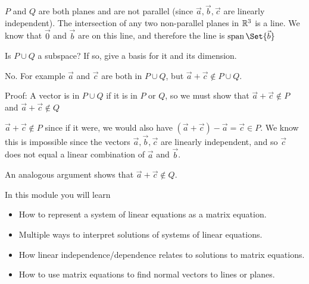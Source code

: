 \documentclass{workbook}
\begin{document}
\begin{slide}
\begin{parts}
\begin{solution}
				$P$ and $Q$ are both planes and are not parallel (since
				$\vec a,\vec b,\vec c$ are linearly independent). The intersection
				of any two non-parallel	planes in $\mathbb{R}^3$ is a line.
				We know that $\vec 0$ and $\vec b$ are on this line, and therefore
				the line is $\Span\Set{\vec b}$
			\end{solution}
		\item Is $P\cup Q$ a subspace? If so, give a basis for it and its dimension.
			\begin{solution}
				No. For example $\vec a$ and $\vec c$ are both in $P\cup Q$, but
				$\vec a+\vec c \notin P\cup Q$.

				Proof: A vector is in $P\cup Q$ if it is in $P$ or $Q$, so we must show
				that $\vec a+\vec c\notin P$ and $\vec a+\vec c\notin Q$

				$\vec a+\vec c \notin P$ since if it were, we would also have
				$(\vec a+\vec c)-\vec a=\vec c\in P$. We know this is impossible
				since the vectors $\vec a,\vec b,\vec c$ are linearly independent,
				and so $\vec c$ does not equal a linear combination of $\vec a$
				and $\vec b$.

				An analogous argument shows that $\vec a+\vec c \notin Q$.
			\end{solution}
	\end{parts}

\end{slide}
\begin{module}
	\label{moduleMatRep}

	In this module you will learn
	\begin{itemize}
		\item How to represent a system of linear equations as a matrix equation.
		\item Multiple ways to interpret solutions of systems of linear equations.
		\item How linear independence/dependence relates to solutions to matrix equations.
		\item How to use matrix equations to find normal vectors to lines or planes.
	\end{itemize}

	
	
\end{module}
\end{document}
